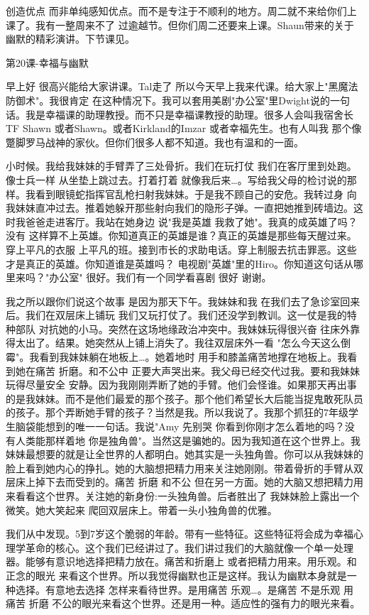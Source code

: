 创造优点 而非单纯感知优点。而不是专注于不顺利的地方。周二就不来给你们上课了。我有一整周来不了 过逾越节。但你们周二还要来上课。Shaun带来的关于幽默的精彩演讲。下节课见。 

第20课-幸福与幽默 

早上好 很高兴能给大家讲课。Tal走了 所以今天早上我来代课。给大家上"黑魔法防御术"。我很肯定 在这种情况下。我可以套用美剧"办公室"里Dwight说的一句话。我是幸福课的助理教授。而不只是幸福课教授的助理。很多人会叫我宿舍长TF Shawn 或者Shawn。或者Kirkland的Imzar 或者幸福先生。也有人叫我 那个像蹩脚罗马战神的家伙。但你们很多人都不知道。我也有温和的一面。 

小时候。我给我妹妹的手臂弄了三处骨折。我们在玩打仗 我们在客厅里到处跑。像士兵一样 从坐垫上跳过去。打着打着 就像我后来…。写给我父母的检讨说的那样。我看到眼镜蛇指挥官乱枪扫射我妹妹。于是我不顾自己的安危。我转过身 向我妹妹直冲过去。推着她躲开那些射向我们的隐形子弹。一直把她推到砖墙边。这时我爸爸走进客厅。我站在她身边 说"我是英雄 我救了她"。我真的成英雄了吗？没有 这样算不上英雄。你知道真正的英雄是谁？真正的英雄是那些每天醒过来。穿上平凡的衣服 上平凡的班。接到市长的求助电话。穿上制服去抗击罪恶。这些才是真正的英雄。你知道谁是英雄吗？ 电视剧"英雄"里的Hiro。你知道这句话从哪里来吗？"办公室" 很好。我们有一个同学看喜剧 很好 谢谢。 

我之所以跟你们说这个故事 是因为那天下午。我妹妹和我 在我们去了急诊室回来后。我们在双层床上铺玩 我们又玩打仗了。我们还没学到教训。这一仗是我的特种部队 对抗她的小马。突然在这场地缘政治冲突中。我妹妹玩得很兴奋 往床外靠得太出了。结果。她突然从上铺上消失了。我往双层床外一看 "怎么今天这么倒霉"。我看到我妹妹躺在地板上…。她着地时 用手和膝盖痛苦地撑在地板上。我看到她在痛苦 折磨。和不公中 正要大声哭出来。我父母已经交代过我。要和我妹妹玩得尽量安全 安静。因为我刚刚弄断了她的手臂。他们会怪谁。如果那天再出事的是我妹妹。而不是他们最爱的那个孩子。那个他们希望长大后能当捉鬼敢死队员的孩子。那个弄断她手臂的孩子？当然是我。所以我说了。我那个抓狂的7年级学生脑袋能想到的唯一一句话。我说"Amy 先别哭 你看到你刚才怎么着地的吗？没有人类能那样着地 你是独角兽"。当然这是骗她的。因为我知道在这个世界上。我妹妹最想要的就是让全世界的人都明白。她其实是一头独角兽。你可以从我妹妹的脸上看到她内心的挣扎。她的大脑想把精力用来关注她刚刚。带着骨折的手臂从双层床上掉下去而受到的。痛苦 折磨 和不公 但在另一方面。她的大脑又想把精力用来看看这个世界。关注她的新身份:一头独角兽。后者胜出了 我妹妹脸上露出一个微笑。她大笑起来 爬回双层床上。带着一头小独角兽的优雅。 

我们从中发现。5到7岁这个脆弱的年龄。带有一些特征。这些特征将会成为幸福心理学革命的核心。这个我们已经讲过了。我们讲过我们的大脑就像一个单一处理器。能够有意识地选择把精力放在。痛苦和折磨上 或者把精力用来。用乐观。和正念的眼光 来看这个世界。所以我觉得幽默也正是这样。我认为幽默本身就是一种选择。有意地去选择 怎样来看待世界。是用痛苦 乐观…。是痛苦 不是乐观 用痛苦 折磨 不公的眼光来看这个世界。还是用一种。适应性的强有力的眼光来看。 

